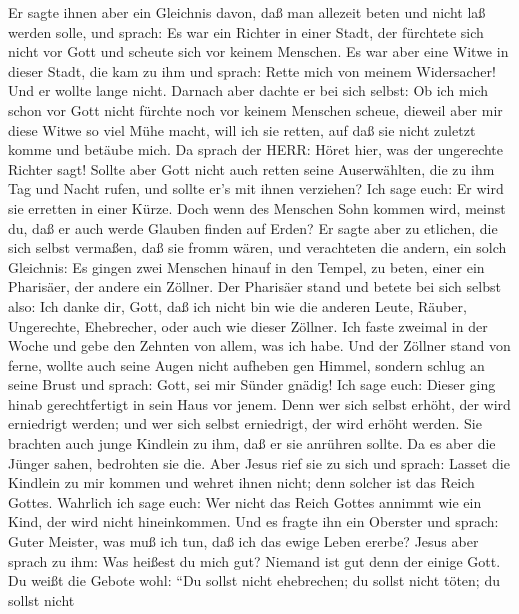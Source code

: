  Er sagte ihnen aber ein Gleichnis davon, daß man allezeit
beten und nicht laß werden solle,  und sprach: Es war ein
Richter in einer Stadt, der fürchtete sich nicht vor Gott und scheute
sich vor keinem Menschen.  Es war aber eine Witwe in dieser
Stadt, die kam zu ihm und sprach: Rette mich von meinem Widersacher!
 Und er wollte lange nicht. Darnach aber dachte er bei sich
selbst: Ob ich mich schon vor Gott nicht fürchte noch vor keinem
Menschen scheue,  dieweil aber mir diese Witwe so viel Mühe
macht, will ich sie retten, auf daß sie nicht zuletzt komme und betäube
mich.  Da sprach der HERR: Höret hier, was der ungerechte
Richter sagt!  Sollte aber Gott nicht auch retten seine
Auserwählten, die zu ihm Tag und Nacht rufen, und sollte er's mit ihnen
verziehen?  Ich sage euch: Er wird sie erretten in einer
Kürze. Doch wenn des Menschen Sohn kommen wird, meinst du, daß er auch
werde Glauben finden auf Erden?  Er sagte aber zu etlichen,
die sich selbst vermaßen, daß sie fromm wären, und verachteten die
andern, ein solch Gleichnis:  Es gingen zwei Menschen
hinauf in den Tempel, zu beten, einer ein Pharisäer, der andere ein
Zöllner.  Der Pharisäer stand und betete bei sich selbst
also: Ich danke dir, Gott, daß ich nicht bin wie die anderen Leute,
Räuber, Ungerechte, Ehebrecher, oder auch wie dieser Zöllner.
 Ich faste zweimal in der Woche und gebe den Zehnten von
allem, was ich habe.  Und der Zöllner stand von ferne,
wollte auch seine Augen nicht aufheben gen Himmel, sondern schlug an
seine Brust und sprach: Gott, sei mir Sünder gnädig!  Ich
sage euch: Dieser ging hinab gerechtfertigt in sein Haus vor jenem. Denn
wer sich selbst erhöht, der wird erniedrigt werden; und wer sich selbst
erniedrigt, der wird erhöht werden.  Sie brachten auch
junge Kindlein zu ihm, daß er sie anrühren sollte. Da es aber die Jünger
sahen, bedrohten sie die.  Aber Jesus rief sie zu sich und
sprach: Lasset die Kindlein zu mir kommen und wehret ihnen nicht; denn
solcher ist das Reich Gottes.  Wahrlich ich sage euch: Wer
nicht das Reich Gottes annimmt wie ein Kind, der wird nicht
hineinkommen.  Und es fragte ihn ein Oberster und sprach:
Guter Meister, was muß ich tun, daß ich das ewige Leben ererbe?
 Jesus aber sprach zu ihm: Was heißest du mich gut? Niemand
ist gut denn der einige Gott.  Du weißt die Gebote wohl:
``Du sollst nicht ehebrechen; du sollst nicht töten; du sollst nicht
